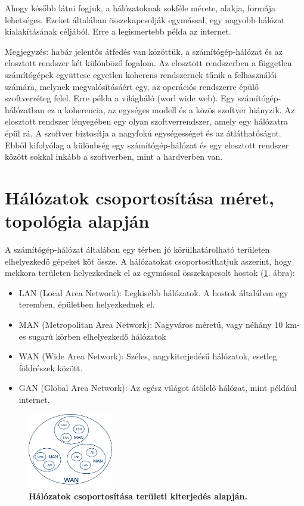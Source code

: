 \documentclass[12pt]{article}
\theoremstyle{plain}
\begin{document}
\par
\medskip
Ahogy később látni fogjuk, a hálózatoknak sokféle mérete, alakja, formája lehetséges. Ezeket általában összekapcsolják egymással, egy nagyobb hálózat kialakításának céljából. Erre a legismertebb példa az internet. 
\par
\medskip
Megjegyzés: habár jelentős átfedés van közöttük, a számítógép-hálózat és az elosztott rendszer két különböző fogalom. Az elosztott rendszerben a független számítógépek együttese egyetlen koherens rendszernek tűnik a felhasználói számára, melynek megvalósításáért egy, az operációs rendszerre épülő szoftverréteg felel. Erre példa a világháló (worl wide web). Egy számítógép-hálózatban ez a koherencia, az egységes modell és a közös szoftver hiányzik. Az elosztott rendszer lényegében egy olyan szoftverrendszer, amely egy hálózatra épül rá. A szoftver biztosítja a nagyfokú egységességet és az átláthatóságot. Ebből kifolyólag a különbség egy számítógép-hálózat és egy elosztott rendszer között sokkal inkább a szoftverben, mint a hardverben van.

\section{Hálózatok csoportosítása méret, topológia alapján}

A számítógép-hálózat általában egy térben jó körülhatárolható területen elhelyezkedő gépeket köt össze. A hálózatokat csoportosíthatjuk aszerint, hogy mekkora területen helyezkednek el az egymással összekapcsolt hostok (\ref{fig:size}. ábra):
\begin{itemize}
    \item LAN (Local Area Network): Legkisebb hálózatok. A hostok általában egy teremben, épületben helyezkednek el.
    \item MAN (Metropolitan Area Network): Nagyváros méretű, vagy néhány 10 km-es sugarú körben elhelyezkedő hálózatok
    \item WAN (Wide Area Network): Széles, nagykiterjedésű hálózatok, esetleg földrészek között.
    \item GAN (Global Area Network): Az egész világot átölelő hálózat, mint például internet.
\end{itemize}{}

\begin{figure}[H]
    \begin{center}
    \includegraphics[width=0.33\textwidth]{media/size.png}
    \caption{\textbf{Hálózatok csoportosítása területi kiterjedés alapján.}} 
    \label{fig:size}
    \end{center}
\end{figure}
\end{document}
